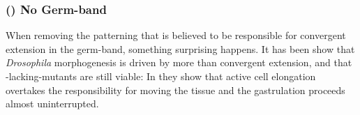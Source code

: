 






\subsubsection{() No Germ-band }
\label{sec:mutantNoGB}
When removing the patterning that is believed to be responsible for convergent extension in the germ-band, something surprising happens. It has been show that \textit{Drosophila} morphogenesis is driven by more than convergent extension, and that -lacking-mutants are still viable: In  they show that active cell elongation overtakes the responsibility for moving the tissue and the gastrulation proceeds almost uninterrupted.\\

